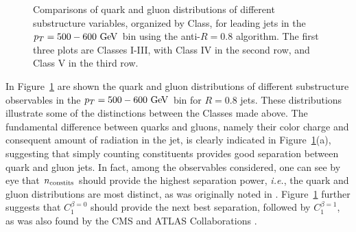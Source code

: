 \begin{figure}
\caption{Comparisons of quark and gluon distributions of different substructure variables, organized by Class, for leading jets in the 
$\pt=500-600 \GeV$ bin using the anti-\kT $R=0.8$ algorithm. The first three plots are Classes I-III, with Class IV in the second row, and Class V in the third row.}
\label{fig:qg_pt500_subst_AKt_R08}
\end{figure}

In Figure~\ref{fig:qg_pt500_subst_AKt_R08} are shown the quark and
gluon distributions of different substructure observables in the
$\pt=500-600\GeV$ bin for $R=0.8$ jets. These distributions illustrate some of the distinctions between the Classes made above. 
The fundamental difference between quarks and gluons, namely their color charge and consequent amount of radiation in the jet, is clearly indicated in Figure~\ref{fig:qg_pt500_subst_AKt_R08}(a), 
suggesting that simply counting constituents  provides good separation between quark and gluon jets.  In fact, among the observables
considered, one can see by eye that $n_{\rm constits}$ should provide the highest separation
power, \textit{i.e.}, the quark and gluon distributions are most distinct, as was originally noted in \cite{Gallicchio:2011xq,Gallicchio:2012ez}. 
Figure~\ref{fig:qg_pt500_subst_AKt_R08} further suggests
that $C_1^{\beta=0}$ should provide the next best separation, followed by $C_1^{\beta=1}$, as was also
found by the CMS and ATLAS Collaborations \cite{CMS:2013kfa,Aad:2014gea}.   

